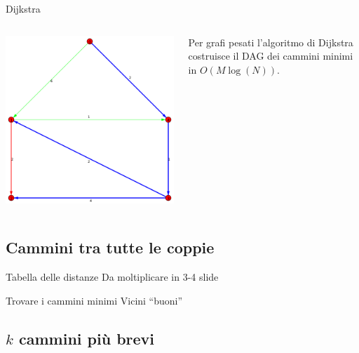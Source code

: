 \documentclass{beamer}
\theoremstyle{plain}
\theoremstyle{definition}
\theoremstyle{remark}
\newcommand{\pa}[1]{\left(#1\right)}
\begin{document}
\begin{frame}{Dijkstra}
    \begin{columns}
    \begin{column}{0.40\textwidth}
      \includegraphics[width=\textwidth]{dijkstra} %
    \end{column}
    \begin{column}{0.58\textwidth}
      Per grafi pesati l'algoritmo di Dijkstra costruisce il DAG dei
      cammini minimi in $O\pa{M\log \pa{N}}$.
    \end{column}
  \end{columns}  
\end{frame}

\subsection{Cammini tra tutte le coppie}

\begin{frame}{Tabella delle distanze}
  Da moltiplicare in 3-4 slide
\end{frame}

\begin{frame}{Trovare i cammini minimi}
  Vicini ``buoni''
\end{frame}


\subsection{$k$ cammini pi\`u brevi}
\end{document}

